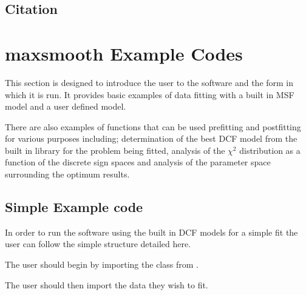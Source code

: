 \documentclass[letterpaper,10pt,english]{sphinxmanual}
\begin{document}
\section{Citation}
\label{\detokenize{source/intro:citation}}

\chapter{maxsmooth Example Codes}
\label{\detokenize{source/maxsmooth:maxsmooth-example-codes}}\label{\detokenize{source/maxsmooth::doc}}
This section is designed to introduce the user to the software and the form
in which it is run. It provides basic examples of data fitting with a built in
MSF model and a user defined model.

There are also examples of functions that can be used pre\sphinxhyphen{}fitting and post\sphinxhyphen{}fitting
for various purposes including; determination of the best DCF model from the
built in library for the problem being fitted, analysis of the \({\chi^2}\)
distribution as a function of the discrete sign spaces and analysis of the
parameter space surrounding the optimum results.


\section{Simple Example code}
\label{\detokenize{source/maxsmooth:simple-example-code}}
In order to run the  software using the built
in DCF models for a simple fit the user can follow the simple structure detailed here.

The user should begin by importing the  class from .

\begin{sphinxVerbatim}[commandchars=\\\{\}]
   
\end{sphinxVerbatim}

The user should then import the data they wish to fit.

\begin{sphinxVerbatim}[commandchars=\\\{\}]
   

  
  
\end{sphinxVerbatim}
\end{document}
